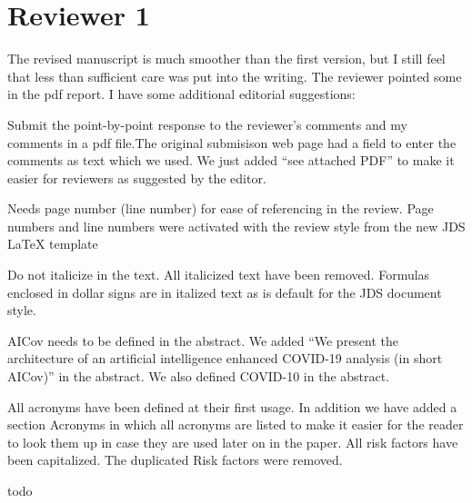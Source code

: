 \section*{Reviewer 1}

The revised manuscript is much smoother than the first version, but I
still feel that less than sufficient care was put into the
writing. The reviewer pointed some in the pdf report. I have some
additional editorial suggestions:

\bigskip

   {Submit the point-by-point response to the
    reviewer's comments and my comments in a pdf file.}{The original
    submisison web page had a field to enter the comments as text
    which we used. We just added ``see attached PDF'' to make it
    easier for reviewers as suggested by the editor.}

   {Needs page number (line number) for ease of
    referencing in the review.}
  {Page numbers and line numbers were
    activated with the review style from the new JDS \LaTeX{}
    template}

   {Do not italicize in the text.}
  {All italicized text
    have been removed.  Formulas enclosed in dollar signs are in
    italized text as is default for the JDS document style.}


   {AICov needs to be defined in the abstract.}
  {We added ``We present the architecture of an artificial
    intelligence enhanced COVID-19 analysis (in short AICov)''
  in the abstract. We also defined COVID-10 in the abstract.}

  {All acronyms have been defined at their first usage. In addition
    we have added a section Acronyms in which all acronyms are listed
    to make it easier for the reader to look them up in case they are
    used later on in the paper. All risk factors have been capitalized.
    The duplicated Risk factors were removed.
  }
  

  { todo}


